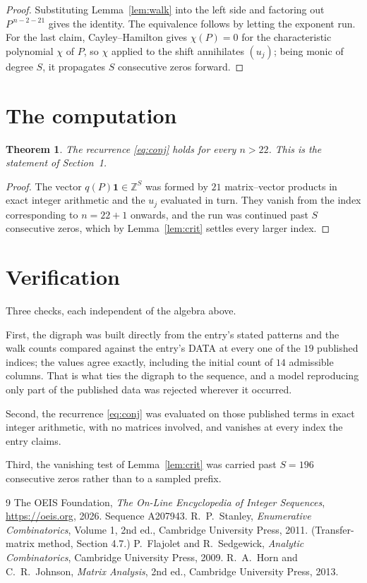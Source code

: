 \documentclass[11pt,a4paper]{article}
\theoremstyle{plain}
\newtheorem{theorem}{Theorem}
\theoremstyle{definition}
\begin{document}
\begin{proof}
Substituting Lemma~\ref{lem:walk} into the left side and factoring out
$P^{\,n-2-21}$ gives the identity. The equivalence follows by letting the exponent
run. For the last claim, Cayley--Hamilton gives $\chi(P)=0$ for the characteristic
polynomial $\chi$ of $P$, so $\chi$ applied to the shift annihilates $(u_j)$; being monic of
degree $S$, it propagates $S$ consecutive zeros forward.
\end{proof}

\section{The computation}

\begin{theorem}
The recurrence \eqref{eq:conj} holds for every $n>22$. This is the statement of
Section~1.
\end{theorem}

\begin{proof}
The vector $q(P)\mathbf{1}\in\mathbb{Z}^{S}$ was formed by $21$ matrix--vector
products in exact integer arithmetic and the $u_j$ evaluated in turn. They vanish from the
index corresponding to $n=22+1$ onwards, and the run was continued past $S$ consecutive
zeros, which by Lemma~\ref{lem:crit} settles every larger index.
\end{proof}

\section{Verification}

Three checks, each independent of the algebra above.

First, the digraph was built directly from the entry's stated patterns and the walk counts
compared against the entry's DATA at every one of the $19$ published indices; the
values agree exactly, including the initial count of $14$ admissible columns. That is
what ties the digraph to the sequence, and a model reproducing only part of the published
data was rejected wherever it occurred.

Second, the recurrence \eqref{eq:conj} was evaluated on those published terms in exact
integer arithmetic, with no matrices involved, and vanishes at every index the entry claims.

Third, the vanishing test of Lemma~\ref{lem:crit} was carried past $S=196$ consecutive
zeros rather than to a sampled prefix.

\begin{thebibliography}{9}
 The OEIS Foundation, \emph{The On-Line Encyclopedia of Integer
Sequences}, \url{https://oeis.org}, 2026. Sequence A207943.
 R.~P.~Stanley, \emph{Enumerative Combinatorics}, Volume 1, 2nd ed.,
Cambridge University Press, 2011. (Transfer-matrix method, Section 4.7.)
 P.~Flajolet and R.~Sedgewick, \emph{Analytic Combinatorics}, Cambridge
University Press, 2009.
 R.~A.~Horn and C.~R.~Johnson, \emph{Matrix Analysis}, 2nd ed., Cambridge
University Press, 2013.
\end{thebibliography}
\end{document}
